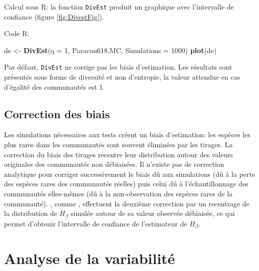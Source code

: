 \documentclass[
  11pt,
  french,
  a4paper,
  extrafontsizes,onecolumn,openright
  ]{memoir}
\newenvironment{Shaded}{\begin{snugshade}}{\end{snugshade}}
\newcommand{\DataTypeTok}[1]{\textcolor[rgb]{0.13,0.29,0.53}{#1}}
\newcommand{\DecValTok}[1]{\textcolor[rgb]{0.00,0.00,0.81}{#1}}
\newcommand{\KeywordTok}[1]{\textcolor[rgb]{0.13,0.29,0.53}{\textbf{#1}}}
\newcommand{\NormalTok}[1]{#1}
\newcommand{\StringTok}[1]{\textcolor[rgb]{0.31,0.60,0.02}{#1}}
\begin{document}
\normalsize

Calcul sous R: la fonction \texttt{DivEst} produit un graphique avec l'intervalle de confiance (figure \ref{fig:DivestFig}).

Code R:

\scriptsize

\begin{Shaded}
\begin{Highlighting}[]
\NormalTok{de <-}\StringTok{ }\KeywordTok{DivEst}\NormalTok{(}\DataTypeTok{q =} \DecValTok{1}\NormalTok{, Paracou618.MC, }\DataTypeTok{Simulations =} \DecValTok{1000}\NormalTok{)}
\KeywordTok{plot}\NormalTok{(de)}
\end{Highlighting}
\end{Shaded}

\normalsize

Par défaut, \texttt{DivEst} ne corrige pas les biais d'estimation.
Les résultats sont présentés sous forme de diversité et non d'entropie, la valeur attendue en cas d'égalité des communautés est 1.

\hypertarget{correction-des-biais}{%
\subsection{Correction des biais}\label{correction-des-biais}}

Les simulations nécessaires aux tests créent un biais d'estimation: les espèces les plus rares dans les communautés sont souvent éliminées par les tirages.
La correction du biais des tirages recentre leur distribution autour des valeurs originales des communautés non débiaisées.
Il n'existe pas de correction analytique pour corriger successivement le biais dû aux simulations (dû à la perte des espèces rares des communautés réelles) puis celui dû à l'échantillonnage des communautés elles-mêmes (dû à la non-observation des espèces rares de la communauté).
\textcite{Marcon2012a}, comme \textcite{Chao2015}, effectuent la deuxième correction par un recentrage de la distribution de \(H_{\beta}\) simulée autour de sa valeur observée débiaisée, ce qui permet d'obtenir l'intervalle de confiance de l'estimateur de \(H_{\beta}\).

\hypertarget{analyse-de-la-variabilituxe9-1}{%
\section{Analyse de la variabilité}\label{analyse-de-la-variabilituxe9-1}}
\end{document}
